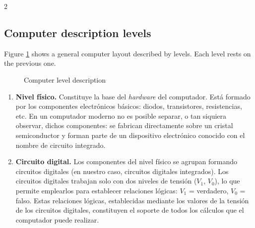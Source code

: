 \begin{paracol}{2}
\subsection{Computer description levels}
Figure \ref{fig:nivele} shows a general computer layout described by levels. Each level rests on the previous one.
\begin{figure}[ht]
	\centering
{}
	\renewcommand{\figurename}{Figure}
	\caption{Computer level description}
	\label{fig:nivele}
\end{figure}
\switchcolumn
\begin{enumerate}
\item \textbf{Nivel físico.} Constituye la base del \emph{hardware} del computador. Está formado por los componentes electrónicos básicos: diodos, transistores, resistencias, etc. En un computador moderno no es posible separar, o tan siquiera observar, dichos componentes: se fabrican directamente sobre un cristal semiconductor y forman parte de un dispositivo electrónico conocido con el nombre de circuito integrado.

\item \textbf{Circuito digital.}
Los componentes del nivel físico se agrupan formando circuitos digitales (en nuestro caso, circuitos digitales integrados). Los circuitos digitales trabajan solo con dos niveles de tensión ($V_1$, $V_0$), lo que permite emplearlos para establecer relaciones lógicas: $V_1$ = verdadero, $V_0$ = falso. Estas relaciones lógicas, establecidas mediante los valores de la tensión de los circuitos digitales, constituyen el soporte de todos los cálculos que el computador puede realizar.


\end{enumerate}
\end{paracol}
